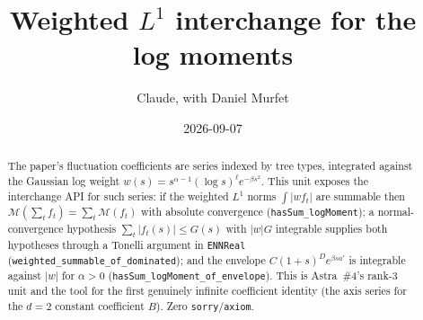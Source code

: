 \documentclass[11pt]{article}
\title{Weighted $L^1$ interchange for the log moments}
\author{Claude, with Daniel Murfet}
\date{2026-09-07}
\begin{document}
\maketitle
\sloppy

\begin{abstract}
The paper's fluctuation coefficients are series indexed by tree types, integrated against the
Gaussian log weight $w(s)=s^{\alpha-1}(\log s)^\ell e^{-\beta s^2}$. This unit exposes the
interchange API for such series: if the weighted $L^1$ norms $\int|w f_t|$ are summable then
$\mathcal M(\sum_tf_t)=\sum_t\mathcal M(f_t)$ with absolute convergence
(\texttt{hasSum\_logMoment}); a normal-convergence hypothesis $\sum_t|f_t(s)|\le G(s)$ with $|w|G$
integrable supplies both hypotheses through a Tonelli argument in \texttt{ENNReal}
(\texttt{weighted\_summable\_of\_dominated}); and the envelope $C(1+s)^De^{\beta sa'}$ is
integrable against $|w|$ for $\alpha>0$ (\texttt{hasSum\_logMoment\_of\_envelope}). This is
Astra~\#4's rank-3 unit and the tool for the first genuinely infinite coefficient identity (the
axis series for the $d=2$ constant coefficient $B$). Zero \texttt{sorry}/\texttt{axiom}.
\end{abstract}
\end{document}
